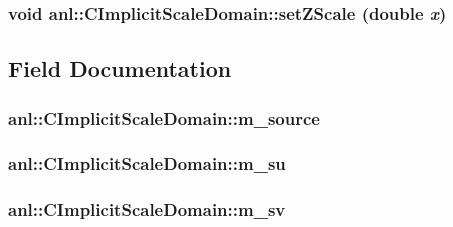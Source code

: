 \label{classanl_1_1CImplicitScaleDomain_a8ab377fd0f03119a9bbd9d399d0721d7}
\hypertarget{classanl_1_1CImplicitScaleDomain_a6df7caf2ba1f5f8e30e57c17dffda2dd}{
\subsubsection[{setZScale}]{\setlength{\rightskip}{0pt plus 5cm}void anl::CImplicitScaleDomain::setZScale (double {\em x})}}
\label{classanl_1_1CImplicitScaleDomain_a6df7caf2ba1f5f8e30e57c17dffda2dd}


\subsection{Field Documentation}
\hypertarget{classanl_1_1CImplicitScaleDomain_a889fb95433830a2b1910f8201048cb00}{
\subsubsection[{m\_\-source}]{ {\bf anl::CImplicitScaleDomain::m\_\-source}}}
\label{classanl_1_1CImplicitScaleDomain_a889fb95433830a2b1910f8201048cb00}
\hypertarget{classanl_1_1CImplicitScaleDomain_a959368449b4782819546edacae79a79f}{
\subsubsection[{m\_\-su}]{ {\bf anl::CImplicitScaleDomain::m\_\-su}}}
\label{classanl_1_1CImplicitScaleDomain_a959368449b4782819546edacae79a79f}
\hypertarget{classanl_1_1CImplicitScaleDomain_a44a1d1bc9344359f028286cd602c4b02}{
\subsubsection[{m\_\-sv}]{ {\bf anl::CImplicitScaleDomain::m\_\-sv}}}
